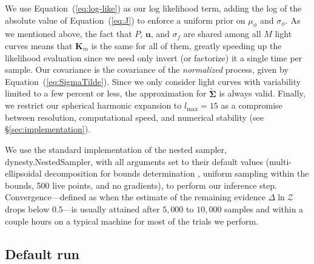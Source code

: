 \documentclass[modern]{aastex62}
\begin{document}
We use Equation~(\ref{eq:log-like}) as our log likelihood
term, adding the log of the absolute value of Equation~(\ref{eq:J}) to
enforce a uniform prior on $\mu_\phi$ and $\sigma_\phi$. As we mentioned
above, the fact that $P$, $\mathbf{u}$, and $\sigma_f$ are shared among
all $M$ light curves means that $\mathbf{K}_m$ is the same for all
of them, greatly speeding up the likelihood evaluation since we need
only invert (or factorize) it a single time per sample. Our
covariance is the covariance of the \emph{normalized} process,
given by Equation~(\ref{eq:SigmaTilde}). Since we only consider light curves
with variability limited to a few percent or less, the approximation for
$\tilde{\pmb{\Sigma}}$ is always valid. Finally, we restrict our spherical
harmonic expansion to $l_\mathrm{max} = 15$ as a compromise between
resolution, computational speed, and numerical stability (see \S\ref{sec:implementation}).

We use the standard implementation of the nested sampler,
\textsf{dynesty.NestedSampler}, with all arguments set to their
default values
(multi-ellipsoidal decomposition for bounds determination \citep{Feroz2009},
uniform sampling within the bounds,
500 live points,
and no gradients), to perform our inference step.
Convergence---defined as when the estimate of the remaining evidence $\Delta\ln \mathcal{Z}$ drops
below $0.5$---is usually attained after $5{,}000$ to $10{,}000$ samples and
within a couple hours on a typical machine for most of the trials we perform.

\subsection{Default run}
\label{sec:inference-default}
\end{document}
